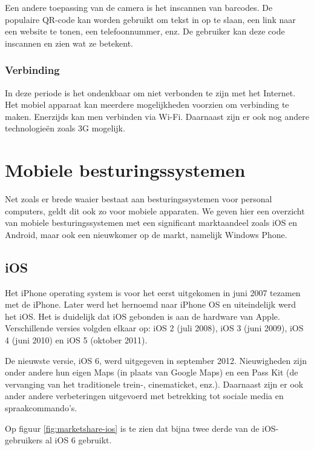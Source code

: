 Een andere toepassing van de camera is het inscannen van barcodes. De populaire QR-code kan worden gebruikt om tekst in op te slaan, een link naar een website te tonen, een telefoonnummer, enz. De gebruiker kan deze code inscannen en zien wat ze betekent.

\subsubsection{Verbinding}
In deze periode is het ondenkbaar om niet verbonden te zijn met het Internet. Het mobiel apparaat kan meerdere mogelijkheden voorzien om verbinding te maken. Enerzijds kan men verbinden via Wi-Fi. Daarnaast zijn er ook nog andere technologieën zoals 3G mogelijk.


\section{Mobiele besturingssystemen}
\label{sec:mobiele-besturingssystemen}
Net zoals er brede waaier bestaat aan besturingssystemen voor personal computers, geldt dit ook zo voor mobiele apparaten. We geven hier een overzicht van mobiele besturingssystemen met een significant marktaandeel zoals iOS en Android, maar ook een nieuwkomer op de markt, namelijk Windows Phone.

\subsection{iOS}
Het iPhone operating system is voor het eerst uitgekomen in juni 2007 tezamen met de iPhone. Later werd het hernoemd naar iPhone OS en uiteindelijk werd het iOS. Het is duidelijk dat iOS gebonden is aan de hardware van Apple. Verschillende versies volgden elkaar op: iOS 2 (juli 2008), iOS 3 (juni 2009), iOS 4 (juni 2010) en iOS 5 (oktober 2011). 

De nieuwste versie, iOS 6, werd uitgegeven in september 2012. Nieuwigheden zijn onder andere hun eigen Maps (in plaats van Google Maps) en een Pass Kit (de vervanging van het traditionele trein-, cinematicket, enz.). Daarnaast zijn er ook ander andere verbeteringen uitgevoerd met betrekking tot sociale media en spraakcommando's.

Op figuur \ref{fig:marketshare-ios} is te zien dat bijna twee derde van de iOS-gebruikers al iOS 6 gebruikt.

